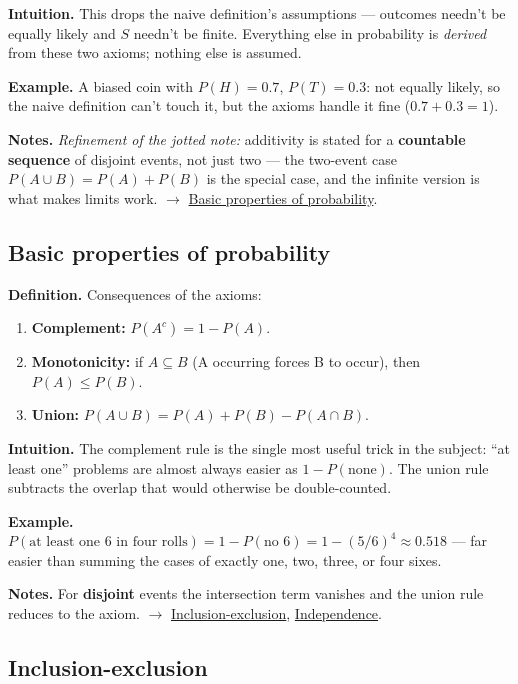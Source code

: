 \documentclass[11pt,a4paper]{article}
\begin{document}
\textbf{Intuition.} This drops the naive definition's assumptions --- outcomes needn't be equally likely and $S$ needn't be finite. Everything else in probability is \textit{derived} from these two axioms; nothing else is assumed.

\textbf{Example.} A biased coin with $P(H) = 0.7$, $P(T) = 0.3$: not equally likely, so the naive definition can't touch it, but the axioms handle it fine ($0.7 + 0.3 = 1$).

\textbf{Notes.} \textit{Refinement of the jotted note:} additivity is stated for a \textbf{countable sequence} of disjoint events, not just two --- the two-event case $P(A \cup  B) = P(A) + P(B)$ is the special case, and the infinite version is what makes limits work. $\to$ \hyperref[sec:basic-properties-of-probability]{Basic properties of probability}.

\subsection{Basic properties of probability}\label{sec:basic-properties-of-probability}

\textbf{Definition.} Consequences of the axioms:
\begin{enumerate}[leftmargin=1.4em]
\item \textbf{Complement:} $P(A^{c}) = 1 - P(A)$.
\item \textbf{Monotonicity:} if $A \subseteq  B$ (A occurring forces B to occur), then $P(A) \leq  P(B)$.
\item \textbf{Union:} $P(A \cup  B) = P(A) + P(B) - P(A \cap  B)$.
\end{enumerate}

\textbf{Intuition.} The complement rule is the single most useful trick in the subject: ``at least one'' problems are almost always easier as $1 - P(\text{none})$. The union rule subtracts the overlap that would otherwise be double-counted.

\textbf{Example.} $P(\text{at least one 6 in four rolls}) = 1 - P(\text{no 6}) = 1 - (5/6)^{4} \approx  0.518$ --- far easier than summing the cases of exactly one, two, three, or four sixes.

\textbf{Notes.} For \textbf{disjoint} events the intersection term vanishes and the union rule reduces to the axiom. $\to$ \hyperref[sec:inclusion-exclusion]{Inclusion-exclusion}, \hyperref[sec:independence]{Independence}.

\subsection{Inclusion-exclusion}\label{sec:inclusion-exclusion}
\end{document}
